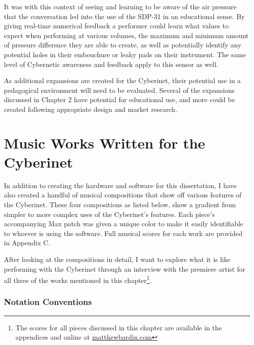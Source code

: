 It was with this context of seeing and learning to be aware of the air pressure that the conversation led into the use of the SDP-31 in an educational sense. By giving real-time numerical feedback a performer could learn what values to expect when performing at various volumes, the maximum and minimum amount of pressure difference they are able to create, as well as potentially identify any potential holes in their embouchure or leaky pads on their instrument. The same level of Cybernetic awareness and feedback apply to this sensor as well.

As additional expansions are created for the Cyberinet, their potential use in a pedagogical environment will need to be evaluated. Several of the expansions discussed in Chapter 2 have potential for educational use, and more could be created following appropriate design and market research.

\chapter{Music Works Written for the Cyberinet}

In addition to creating the hardware and software for this dissertation, I have also created a handful of musical compositions that show off various features of the Cyberinet. These four compositions as listed below, show a gradient from simpler to more complex uses of the Cyberinet’s features. Each piece's accompanying Max patch was given a unique color to make it easily identifiable to whoever is using the software. Full musical scores for each work are provided in Appendix C.

After looking at the compositions in detail, I want to explore what it is like performing with the Cyberinet through an interview with the premiere artist for all three of the works mentioned in this chapter\footnote{The scores for all pieces discussed in this chapter are available in the appendices and online at \url{matthewbardin.com}}.

\subsection{Notation Conventions}

